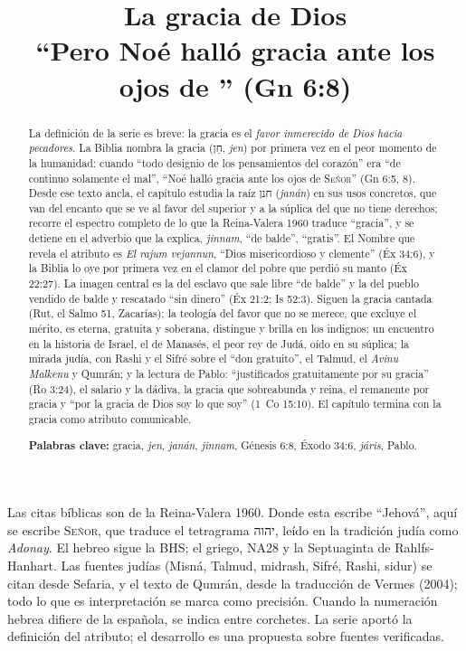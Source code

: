 \documentclass[11pt,letterpaper]{article}
\title{\color{azul}\bfseries La gracia de Dios\\[4pt]\large\color{gris}\mdseries ``Pero Noé halló gracia ante los ojos de \SENOR{}'' (Gn 6:8)}
\author{}\date{}
\newcommand{\heb}[1]{\mbox{\foreignlanguage{hebrew}{#1}}}
\newcommand{\SENOR}{\textsc{Señor}}
\begin{document}
\maketitle\thispagestyle{empty}

\begin{abstract}\noindent
La definición de la serie es breve: la gracia es el \emph{favor inmerecido de Dios hacia pecadores}. La Biblia nombra la gracia (\heb{חֵן}, \emph{jen}) por primera vez en el peor momento de la humanidad: cuando ``todo designio de los pensamientos del corazón'' era ``de continuo solamente el mal'', ``Noé halló gracia ante los ojos de \SENOR{}'' (Gn 6:5, 8). Desde ese texto ancla, el capítulo estudia la raíz \heb{חנן} (\emph{janán}) en sus usos concretos, que van del encanto que se ve al favor del superior y a la súplica del que no tiene derechos; recorre el espectro completo de lo que la Reina-Valera 1960 traduce ``gracia'', y se detiene en el adverbio que la explica, \emph{jinnam}, ``de balde'', ``gratis''. El Nombre que revela el atributo es \emph{El rajum vejannun}, ``Dios misericordioso y clemente'' (Éx 34:6), y la Biblia lo oye por primera vez en el clamor del pobre que perdió su manto (Éx 22:27). La imagen central es la del esclavo que sale libre ``de balde'' y la del pueblo vendido de balde y rescatado ``sin dinero'' (Éx 21:2; Is 52:3). Siguen la gracia cantada (Rut, el Salmo 51, Zacarías); la teología del favor que no se merece, que excluye el mérito, es eterna, gratuita y soberana, distingue y brilla en los indignos; un encuentro en la historia de Israel, el de Manasés, el peor rey de Judá, oído en su súplica; la mirada judía, con Rashi y el Sifré sobre el ``don gratuito'', el Talmud, el \emph{Avinu Malkenu} y Qumrán; y la lectura de Pablo: ``justificados gratuitamente por su gracia'' (Ro 3:24), el salario y la dádiva, la gracia que sobreabunda y reina, el remanente por gracia y ``por la gracia de Dios soy lo que soy'' (1~Co 15:10). El capítulo termina con la gracia como atributo comunicable.
\par\smallskip\noindent\textbf{Palabras clave:} gracia, \emph{jen}, \emph{janán}, \emph{jinnam}, Génesis 6:8, Éxodo 34:6, \emph{járis}, Pablo.\end{abstract}

\begin{nota}
Las citas bíblicas son de la Reina-Valera 1960. Donde esta escribe ``Jehová'', aquí se escribe \SENOR, que traduce el tetragrama \heb{יהוה}, leído en la tradición judía como \emph{Adonay}. El hebreo sigue la BHS; el griego, NA28 y la Septuaginta de Rahlfs-Hanhart. Las fuentes judías (Misná, Talmud, midrash, Sifré, Rashi, sidur) se citan desde Sefaria, y el texto de Qumrán, desde la traducción de Vermes (2004); todo lo que es interpretación se marca como precisión. Cuando la numeración hebrea difiere de la española, se indica entre corchetes. La serie aportó la definición del atributo; el desarrollo es una propuesta sobre fuentes verificadas.
\end{nota}
\end{document}
